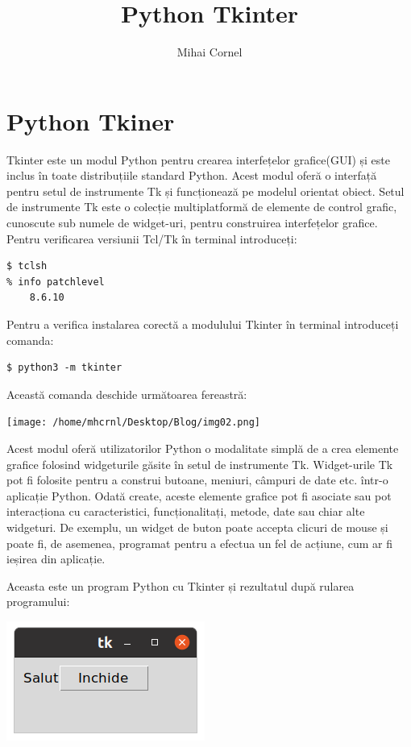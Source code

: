 \documentclass[12pt,a4paper]{book}
\author{Mihai Cornel}
\title{Python Tkinter}
\begin{document}
\section{Python Tkiner}
	Tkinter este un modul Python pentru crearea interfețelor grafice(GUI) și este inclus în toate distribuțiile standard Python. Acest modul oferă o interfață pentru setul de instrumente Tk și funcționează pe modelul orientat obiect. Setul de instrumente Tk este o colecție multiplatformă de elemente de control grafic, cunoscute sub numele de widget-uri, pentru construirea interfețelor grafice.
Pentru verificarea versiunii Tcl/Tk în terminal introduceți:
\begin{verbatim}
$ tclsh
% info patchlevel
	8.6.10
\end{verbatim}
Pentru a verifica instalarea corectă a modulului Tkinter în terminal introduceți comanda:
\begin{verbatim}
$ python3 -m tkinter
\end{verbatim}
Această comanda deschide următoarea fereastră:

\texttt{[image: /home/mhcrnl/Desktop/Blog/img02.png]}

Acest modul oferă utilizatorilor Python o modalitate simplă de a crea elemente grafice folosind widgeturile găsite în setul de instrumente Tk.  Widget-urile Tk pot fi folosite pentru a construi butoane, meniuri, câmpuri de date etc. într-o aplicație Python.  Odată create, aceste elemente grafice pot fi asociate sau pot interacționa cu caracteristici, funcționalitați, metode, date sau chiar alte widgeturi. 
De exemplu, un widget de buton poate accepta clicuri de mouse și poate fi, de asemenea, programat pentru a efectua un fel de acțiune, cum ar fi ieșirea din aplicație.
	
	Aceasta este un program Python cu Tkinter și rezultatul după rularea programului:

\includegraphics[width=\linewidth]{img01.png}
\end{document}
